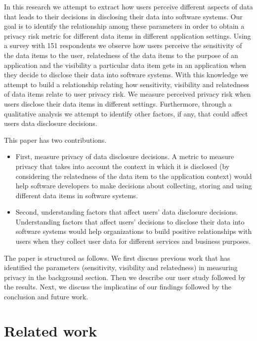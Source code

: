 \documentclass[conference]{IEEEtran}
\begin{document}
In this research we attempt to extract how users perceive different aspects of data that leads to their decisions in disclosing their data into software systems. Our goal is to identify the relationship among these parameters in order to obtain a privacy risk metric for different data items in different application settings. Using a survey with 151 respondents we observe how users perceive the sensitivity of the data items to the user, relatedness of the data items to the purpose of an application and the visibility a particular data item gets in an application when they decide to disclose their data into software systems. With this knowledge we attempt to build a relationship relating how sensitivity, visibility and relatedness of data items relate to user privacy risk. We measure perceived privacy risk when users disclose their data items in different settings. Furthermore, through a qualitative analysis we attempt to identify other factors, if any, that could affect users data disclosure decisions.

This paper has two contributions.

\begin{itemize}
\item  First, measure privacy of data disclosure decisions. A metric to measure privacy that takes into account the context in which it is disclosed (by considering the relatedness of the data item to the application context) would help software developers to make decisions about collecting, storing and using different data items in software systems. 
\item Second, understanding factors that affect users' data disclosure decisions. Understanding factors that affect users' decisions to disclose their data into software systems would help organizations to build positive relationships with users when they collect user data for different services and business purposes. 
\end{itemize}

The paper is structured as follows. We first discuss previous work that has identified the parameters (sensitivity, visibility and relatedness) in measuring privacy in the background section. Then we describe our user study followed by the results. Next, we discuss the implicatins of our findings followed by the conclusion and future work.

\section {Related work}
\end{document}

